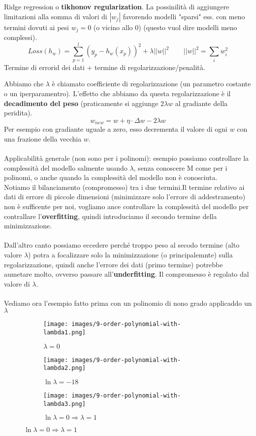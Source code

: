 \begin{definition}
    Ridge regression o \textbf{tikhonov regularization}. La possinilità di aggiungere limitazioni alla somma di valori di $|w_j|$ favorendo modelli "sparsi" ess. con 
    meno termini dovuti ai pesi $w_j = 0$ (o vicino allo 0) (questo vuol dire modelli meno complessi).
    $$Loss(h_w) = \sum_{p=1}^{l}(y_p - h_w(x_p))^2 + \lambda||w||^2 \hspace{25pt} ||w||^2 = \sum_{i}w_i^2$$
    Termine di errorid dei dati + termine di regolarizzazione/penalità.
\end{definition}
\hspace{-15pt}Abbiamo che $\lambda$ è chiamato coefficiente di regolarizzazione (un parametro costante o un iperparamentro). L'effetto che abbiamo 
da questa regolarizzazione è il \textbf{decadimento del peso} (praticamente si aggiunge $2\lambda w$ al gradiante della peridita).
$$w_{new} = w + \eta \cdot \Delta w - 2 \lambda w$$
Per esempio con gradiante uguale a zero, esso decrementa il valore di ogni $w$ con una frazione della vecchia $w$.\\\\
Applicabilità generale (non sono per i polinomi): esempio possiamo controllare la complessità del modello salmente usando $\lambda$, senza conoscere
M come per i polinomi, o anche quando la complessità del modello non è conosciuta. \\
Notiamo il bilanciamento (compromesso) tra i due termini.Il termine relativo ai dati di errore di piccole dimensioni (minimizzare solo l'errore di addestramento) non
è sufficente per noi, vogliamo ance controllare la complessità del modello per contrallare l'\textbf{overfitting}, quindi introduciamo il secondo termine della minimizzazione.\\\\
Dall'altro canto possiamo eccedere perché troppo peso al secodo termine (alto valore $\lambda$) potra a focalizzare solo la minimizzazione (o principalemnte) sulla regolarizzazione,
quindi anche l'errore dei dati (primo termine) potrebbe aumetare molto, ovverso passare all'\textbf{underfitting}. Il compromesso è regolato dal valore di $\lambda$. 
\\\\Vediamo ora l'esempio fatto prima con un polinomio di nono grado applicaddo un $\lambda$
\begin{figure}[h!]
    \centering
    \begin{subfigure}{.3\textwidth}
        \texttt{[image: images/9-order-polynomial-with-lambda1.png]}
        \caption{$\lambda = 0$}
    \end{subfigure}
    \begin{subfigure}{.3\textwidth}
        \texttt{[image: images/9-order-polynomial-with-lambda2.png]}
        \caption{$\ln\lambda = -18$}
    \end{subfigure}
    \begin{subfigure}{.3\textwidth}
        \texttt{[image: images/9-order-polynomial-with-lambda3.png]}
        \caption{$\ln\lambda = 0 \Rightarrow \lambda = 1$}
    \end{subfigure}
\end{figure}
